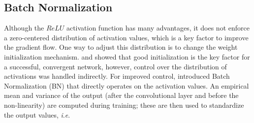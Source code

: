 \documentclass[final,3p,times,twocolumn,authoryear]{elsarticle}
\newcommand{\mxy}[1]{ \color{red}{#1}}
\newcommand{\ie}{\textit{i}.\textit{e}.}
\newcommand{\eg}{\textit{e}.\textit{g}.}
\begin{document}
\subsection{Batch Normalization}
\label{sec:batch_normalization}
Although the $ReLU$ activation function has many advantages, it does not enforce a zero-centered distribution of activation values, which is a key factor to improve the gradient flow. 
One way to adjust this distribution is to change the weight initialization mechanism.  
 and \citet{He_Normal} showed that good initialization is the key factor for a successful, convergent network, however, control over the distribution of activations was handled indirectly.
For improved control, \citet{BatchNorm} introduced Batch Normalization (BN) that directly operates on the activation values. 
An empirical mean and variance of the output (after the convolutional layer and before the non-linearity) are computed during training; these are then used to standardize the output values,  \ie 
\end{document}
